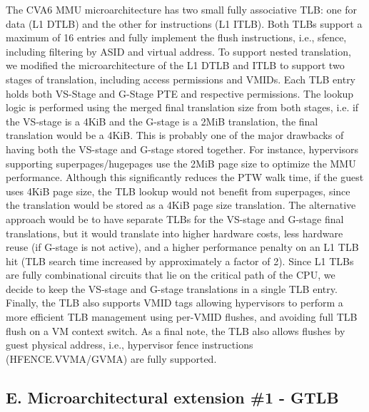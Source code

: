 The CVA6 MMU microarchitecture has two small fully
associative TLB: one for data (L1 DTLB) and the other for
instructions (L1 ITLB). Both TLBs support a maximum of 16
entries and fully implement the flush instructions, i.e., sfence,
including filtering by ASID and virtual address. To support
nested translation, we modified the microarchitecture of the L1
DTLB and ITLB to support two stages of translation, including
access permissions and VMIDs. Each TLB entry holds both
VS-Stage and G-Stage PTE and respective permissions. The
lookup logic is performed using the merged final translation
size from both stages, i.e. if the VS-stage is a 4KiB and
the G-stage is a 2MiB translation, the final translation would
be a 4KiB. This is probably one of the major drawbacks of
having both the VS-stage and G-stage stored together. For
instance, hypervisors supporting superpages/hugepages use the
2MiB page size to optimize the MMU performance. Although
this significantly reduces the PTW walk time, if the guest
uses 4KiB page size, the TLB lookup would not benefit
from superpages, since the translation would be stored as a
4KiB page size translation. The alternative approach would
be to have separate TLBs for the VS-stage and G-stage final
translations, but it would translate into higher hardware costs,
less hardware reuse (if G-stage is not active), and a higher
performance penalty on an L1 TLB hit (TLB search time
increased by approximately a factor of 2). Since L1 TLBs are
fully combinational circuits that lie on the critical path of the
CPU, we decide to keep the VS-stage and G-stage translations
in a single TLB entry. Finally, the TLB also supports VMID
tags allowing hypervisors to perform a more efficient TLB
management using per-VMID flushes, and avoiding full TLB
flush on a VM context switch. As a final note, the TLB also
allows flushes by guest physical address, i.e., hypervisor fence
instructions (HFENCE.VVMA/GVMA) are fully supported.

\subsection*{E. Microarchitectural extension \#1 - GTLB}

